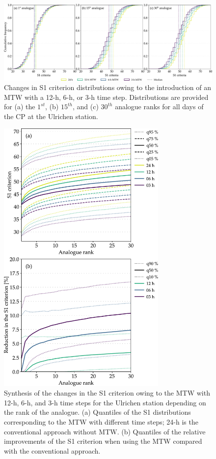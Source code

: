 \documentclass[hess, manuscript]{copernicus}
\begin{document}
	\begin{figure}[htb]
		\begin{center}
			\includegraphics[width=17cm]{fig03.pdf}
		\end{center}
		\caption{Changes in S1 criterion distributions owing to the introduction of an MTW with a 12-h, 6-h, or 3-h time step. Distributions are provided for (a) the $1^{st}$, (b) $15^{th}$, and (c) $30^{th}$ analogue ranks for all days of the CP at the Ulrichen station.}
		\label{fig:changes_S1_analogs}
	\end{figure}
	
	\begin{figure}[htb]
		\begin{center}
			\includegraphics[width=8.3cm]{fig04.pdf}
		\end{center}
		\caption{Synthesis of the changes in the S1 criterion owing to the MTW with 12-h, 6-h, and 3-h time steps for the Ulrichen station depending on the rank of the analogue. (a) Quantiles of the S1 distributions corresponding to the MTW with different time steps; 24-h is the conventional approach without MTW. (b) Quantiles of the relative improvements of the S1 criterion when using the MTW compared with the conventional approach.}
		\label{fig:changes_S1}
	\end{figure}
	
\end{document}
